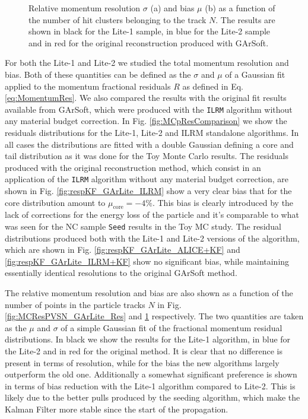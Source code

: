\begin{figure}[t]
\begin{subfigure}[b]{0.48\textwidth}
         \caption{}
         \label{fig:MCResPVSN_GArLite_Bias}
     \end{subfigure}
        \caption{Relative momentum resolution $\sigma$ (a) and bias $\mu$ (b) as a function of the number of hit clusters belonging to the track $N$. The results are shown in black for the Lite-1 sample, in blue for the Lite-2 sample and in red for the original reconstruction produced with GArSoft.} \label{fig:MCResPVSN_GArLite}
\end{figure}

For both the Lite-1 and Lite-2 we studied the total momentum resolution and bias. Both of these quantities can be defined as the $\sigma$ and $\mu$ of a Gaussian fit applied to the momentum fractional residuals $R$ as defined in Eq. \ref{eq:MomentumRes}. 
We also compared the results with the original fit results available from GArSoft, which were produced with the \texttt{ILRM} algorithm without any material budget correction. In Fig. \ref{fig:MCpResComparison} we show the residuals distributions for the Lite-1, Lite-2 and ILRM standalone algorithms. In all cases the distributions are fitted with a double Gaussian defining a core and tail distribution as it was done for the Toy Monte Carlo results. The residuals produced with the original reconstruction method, which consist in an application of the \texttt{ILRM} algorithm without any material budget correction, are shown in Fig. \ref{fig:respKF_GArLite_ILRM} show a very clear bias that for the core distribution amount to $\mu_\text{core}= -4\%$. This bias is clearly introduced by the lack of corrections for the energy loss of the particle and it's comparable to what was seen for the NC sample \texttt{Seed} results in the Toy MC study. The residual distributions produced both with the Lite-1 and Lite-2 versions of the algorithm, which are shown in Fig. \ref{fig:respKF_GArLite_ALICE+KF} and \ref{fig:respKF_GArLite_ILRM+KF} show no significant bias, while maintaining essentially identical resolutions to the original GArSoft method.

The relative momentum resolution and bias are also shown as a function of the number of points in the particle tracks $N$ in Fig. \ref{fig:MCResPVSN_GArLite_Res} and \ref{fig:MCResPVSN_GArLite_Bias} respectively. The two quantities are taken as the $\mu$ and $\sigma$ of a simple Gaussian fit of the fractional momentum residual distributions. In black we show the results for the Lite-1 algorithm, in blue for the Lite-2 and in red for the original method. It is clear that no difference is present in terms of resolution, while for the bias the new algorithms largely outperform the old one. Additionally a somewhat significant preference is shown in terms of bias reduction with the Lite-1 algorithm compared to Lite-2. This is likely due to the better pulls produced by the seeding algorithm, which make the Kalman Filter more stable since the start of the propagation.




